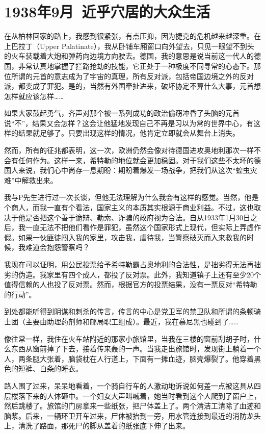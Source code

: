 \documentclass[UTF8]{ctexart}
\begin{document}
\section{1938年9月\ 近乎穴居的大众生活}

在从柏林回家的路上，我感到很紧张，有点压抑，因为捷克的危机越来越深重。在上巴拉丁（Upper Palatinate），我从卧铺车厢窗口向外望去，只见一眼望不到头的火车装载着大炮和弹药向边境方向驶去。德国，我的意思是说当前这一代人的德国，非常认真地掌握了拦路抢劫的技能，它正处于一种极度不同寻常的心态下。那位所谓的元首的意志成为了宇宙的真理，所有反对派，包括帝国边境之外的反对派，都变成了罪犯。是的，当然有外国牵扯进来，破坏协定不算什么大事，元首想怎样就应该怎样……

如果大家鼓起勇气，齐声对那个被一系列成功的政治偷窃冲昏了头脑的元首说“不”，结果又会怎样？这会让他猛地发现自己不再是习以为常的世界中心，有这样的结果就足够了。只要出现这样的情况，他肯定立即就会从舞台上消失。

然而，所有的征兆都表明，这一次，欧洲仍然会像对待德国进攻奥地利那次一样不会有任何作为。这样一来，希特勒的地位就会更加稳固。对于我们这些不太坏的德国人来说，我们心中尚存一息期盼：期盼着爆发一场战争，把我们从这次“蝗虫灾难”中解救出来。

我与P先生进行过一次长谈，但他无法理解为什么我会有这样的感觉。当然，他是个商人，而我一直有个看法，国家主义的本质其实根源于商业利益。不过，这也取决于他是否把这个善于诡辩、勒索、诈骗的政府视为合法。自从1933年1月30日之后，我一直无法不把他们看作是罪犯，虽然这个国家形式上现代，但实际上弄虚作假。如果一伙匪徒闯入我的家里，攻击我，虐待我，当警察破灭而入来救我的时候，我难道会抱怨警察吗？

我现在可以证明，用公民投票给予希特勒霸占奥地利的合法性，是拙劣得无法再拙劣的伪造。我家里有四个成人，都投了反对票。此外，我知道镇子上还有至少20个值得信赖的人也投了反对票。然而，根据官方的投票结果，没有一票反对“希特勒的行动”。

到处都能听得到阴谋和刺杀的传言，传言的中心是党卫军的禁卫队和所谓的条顿骑士团（主要由助理药剂师和邮局职工组成）。最近，我在慕尼黑也碰到了……

像往常一样，我住在火车站附近的那家小旅馆里，当我在三楼的窗前刮胡子时，什么东西从窗前掉了下去，接着传来轰的一声。当我走出旅馆时，发现街上躺着一个人，两条腿大张着，脑袋枕在人行道上，下面有一摊血迹，脑壳爆裂了。他穿着黑色的短裤、白条的睡衣。

路人围了过来，呆呆地看着，一个骑自行车的人激动地诉说如何差一点被这具从四层楼落下来的人体砸中。一个妇女大声叫喊着，她当时看到这个人爬到了窗户上，然后跳楼了。旅馆的门房拿来一些纸张，把尸体盖上了。两个清洁工清除了血迹和脑浆。后来，一辆环卫开车过来，尸体被抬到一旁，用水管连接到最近的消防龙头上，清洗了路面，那死尸的脚从盖着的纸张底下伸了出来。
\end{document}

